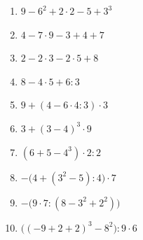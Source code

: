 \begin{enumerate}
\renewcommand{\labelenumi}{\textbf{\arabic{enumi})}}
\setlength{\itemsep}{0pt}
\medmuskip=13mu\thickmuskip=13mu
\item $\displaystyle 9-6^{2}+2\cdot 2-5+3^{3}$
\par\vspace*{1.5cm}
\item $\displaystyle 4-7\cdot 9-3+4+7$
\par\vspace*{1.5cm}
\item $\displaystyle 2-2\cdot 3-2\cdot 5+8$
\par\vspace*{1.5cm}
\item $\displaystyle 8-4\cdot 5+6:3$
\par\vspace*{1.5cm}
\item $\displaystyle 9+(4-6\cdot 4:3)\cdot 3$
\par\vspace*{1.5cm}
\item $\displaystyle 3+(3-4)^{3}\cdot 9$
\par\vspace*{1.5cm}
\item $\displaystyle (6+5-4^{3})\cdot 2:2$
\par\vspace*{1.5cm}
\item $\displaystyle -\bigl(4+(3^{2}-5):4\bigr)\cdot 7$
\par\vspace*{1.5cm}
\item $\displaystyle -\bigl(9\cdot 7:(8-3^{2}+2^{2})\bigr)$
\par\vspace*{1.5cm}
\item $\displaystyle \bigl((-9+2+2)^{3}-8^{2}\bigr):9\cdot 6$
\par\vspace*{1.5cm}
\end{enumerate}
